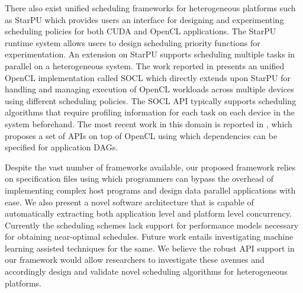 	\par There also exist unified scheduling frameworks for heterogeneous platforms such as StarPU \cite{augonnet2011starpu} which provides users an interface for designing and experimenting scheduling policies for both CUDA and OpenCL applications. The StarPU runtime system allows users to design scheduling priority functions for experimentation. An extension on StarPU \cite{hugo2014composing} supports scheduling multiple tasks in parallel on a heterogeneous system.  The work reported in \cite{henry2014toward} presents an unified OpenCL implementation called SOCL which directly extends upon StarPU for handling and managing execution of OpenCL workloads across multiple devices using different scheduling policies. The SOCL API typically supports scheduling algorithms that require profiling information for each task on each device in the system beforehand. The most recent work in this domain is reported in \cite{pekka}, which proposes a set of APIs on top of OpenCL using which dependencies can be specified for application DAGs.
	\par Despite the vast number of frameworks available, our proposed framework relies on specification files using which programmers can bypass the overhead of implementing complex host programs and design data parallel applications with ease. We also present a novel software architecture that is capable of automatically extracting both application level and platform level concurrency. Currently the scheduling schemes lack support for performance models necessary for obtaining near-optimal schedules. Future work entails investigating machine learning assisted techniques \cite{grewe2011static,grewe2013opencl,kofler2013automatic,smart,schedcl} for the same. We believe the robust API support in our framework  would allow researchers to investigate these avenues and accordingly design and validate novel scheduling algorithms for heterogeneous platforms.